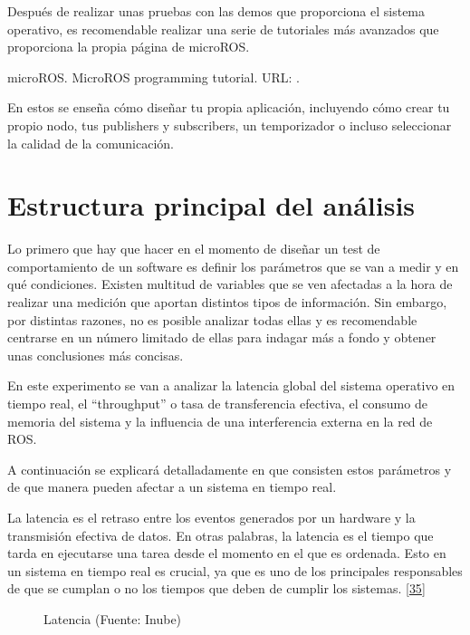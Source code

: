 \documentclass[a4paper,11pt,spanish]{sphinxmanual}
\let\sphinxpxdimen\pdfpxdimen\else\newdimen\sphinxpxdimen
\begin{document}
\sphinxAtStartPar
Después de realizar unas pruebas con las demos que proporciona el sistema
operativo, es recomendable realizar una serie de tutoriales más avanzados
que proporciona la propia página de micro\sphinxhyphen{}ROS. %
\begin{footnote}[1]\sphinxAtStartFootnote
micro\sphinxhyphen{}ROS. Micro\sphinxhyphen{}ROS programming tutorial. URL: .
%
\end{footnote}
En estos se enseña cómo diseñar tu propia aplicación, incluyendo cómo
crear tu propio nodo, tus publishers y subscribers, un temporizador o
incluso seleccionar la calidad de la comunicación.


\section{Estructura principal del análisis}
\label{\detokenize{dise_xf1o_del_analisis:estructura-principal-del-analisis}}
\sphinxAtStartPar
Lo primero que hay que hacer en el momento de diseñar un test de comportamiento
de un software es definir los parámetros que se van a medir y en qué condiciones.
Existen multitud de variables que se ven afectadas a la hora de realizar una
medición que aportan distintos tipos de información. Sin embargo, por distintas
razones, no es posible analizar todas ellas y es recomendable centrarse en un
número limitado de ellas para indagar más a fondo y obtener unas conclusiones
más concisas.

\sphinxAtStartPar
En este experimento se van a analizar la latencia global del sistema operativo
en tiempo real, el “throughput” o tasa de transferencia efectiva, el consumo
de memoria del sistema y la influencia de una interferencia externa en la red de ROS.

\sphinxAtStartPar
A continuación se explicará detalladamente en que consisten estos parámetros
y de que manera pueden afectar a un sistema en tiempo real.

\sphinxAtStartPar
La latencia es el retraso entre los eventos generados por un hardware y la
transmisión efectiva de datos. En otras palabras, la latencia es el tiempo que
tarda en ejecutarse una tarea desde el momento en el que es ordenada.
Esto en un sistema en tiempo real es crucial, ya que es uno de los principales
responsables de que se cumplan o no los tiempos que deben de cumplir los sistemas.
{[}\hyperlink{cite.marco_teorico_y_estado_del_arte:id41}{35}{]}

\begin{figure}[htbp]
\centering
\capstart

\noindent\sphinxincludegraphics[width=200\sphinxpxdimen]{{latency}.png}
\caption{Latencia (Fuente: Inube)}\label{\detokenize{dise_xf1o_del_analisis:id8}}\end{figure}
\end{document}
